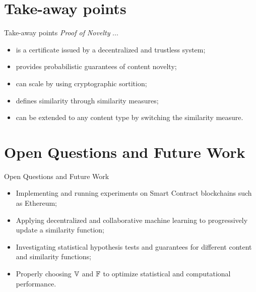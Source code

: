 \documentclass{beamer}
\begin{document}
\section{Take-away points}
\begin{frame}{Take-away points}
    \emph{Proof of Novelty} ...
    \begin{itemize}
        \item is a certificate issued by a decentralized and trustless system;\pause
        \item provides probabilistic guarantees of content novelty;\pause
        \item can scale by using cryptographic sortition;\pause
        \item defines similarity through similarity measures;\pause
        \item can be extended to any content type by switching the similarity measure.
    \end{itemize}
\end{frame}

\section{Open Questions and Future Work}
\begin{frame}{Open Questions and Future Work}
    \begin{itemize}
        \item Implementing and running experiments on Smart Contract blockchains such as Ethereum;\pause
        \item Applying decentralized and collaborative machine learning to progressively update a similarity function;\pause
        \item Investigating statistical hypothesis tests and guarantees
        for different content and similarity functions;\pause
        \item Properly choosing ${\mathbb{V}}$ and ${\mathbb{F}}$ to optimize statistical and computational performance.
    \end{itemize}
\end{frame}

\end{document}
